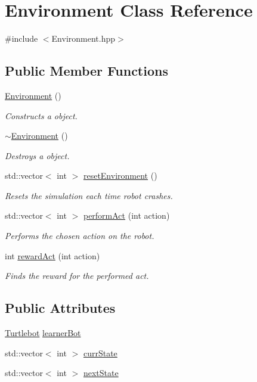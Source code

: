 \hypertarget{classEnvironment}{}\section{Environment Class Reference}
\label{classEnvironment}


{\ttfamily \#include $<$Environment.\+hpp$>$}

\subsection*{Public Member Functions}
\begin{DoxyCompactItemize}
\item 
\hyperlink{classEnvironment_a8b427c4448d8b7536666837521b9e83d}{Environment} ()
\begin{DoxyCompactList}\small\item\em Constructs a object. \end{DoxyCompactList}\item 
\hyperlink{classEnvironment_a8e294735187880dd3d59be10c425b29d}{$\sim$\+Environment} ()
\begin{DoxyCompactList}\small\item\em Destroys a object. \end{DoxyCompactList}\item 
std\+::vector$<$ int $>$ \hyperlink{classEnvironment_a5966800e65ed1c300efc07e66c4bdf4a}{reset\+Environment} ()
\begin{DoxyCompactList}\small\item\em Resets the simulation each time robot crashes. \end{DoxyCompactList}\item 
std\+::vector$<$ int $>$ \hyperlink{classEnvironment_a98d209d06f1d484b7f485009e82569cc}{perform\+Act} (int action)
\begin{DoxyCompactList}\small\item\em Performs the chosen action on the robot. \end{DoxyCompactList}\item 
int \hyperlink{classEnvironment_a4f00dff5955ba6b6608181a3f053e9bb}{reward\+Act} (int action)
\begin{DoxyCompactList}\small\item\em Finds the reward for the performed act. \end{DoxyCompactList}\end{DoxyCompactItemize}
\subsection*{Public Attributes}
\begin{DoxyCompactItemize}
\item 
\hyperlink{classTurtlebot}{Turtlebot} \hyperlink{classEnvironment_aebe4ef0e6fcd4dc434bf48fc671e10a5}{learner\+Bot}
\item 
std\+::vector$<$ int $>$ \hyperlink{classEnvironment_a96b01ffa658eeec4782b40dc852359b0}{curr\+State}
\item 
std\+::vector$<$ int $>$ \hyperlink{classEnvironment_a0a6aadc296ea61bf7890c9f6d486ee12}{next\+State}
\end{DoxyCompactItemize}


